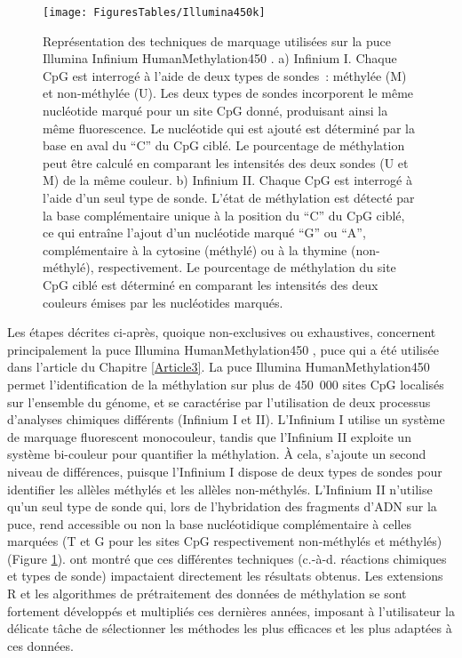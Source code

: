 \documentclass[11pt,a4paper,notrimn]{krantz}
\theoremstyle{definition}
\theoremstyle{definition}
\theoremstyle{remark}
\begin{document}
\begin{figure}[!htb]

{\centering \texttt{[image: FiguresTables/Illumina450k]} 

}

\caption{Représentation des techniques de marquage utilisées
sur la puce Illumina Infinium HumanMethylation450
\citep{maksimovic_swan:_2012}. a) Infinium I. Chaque CpG est interrogé à
l'aide de deux types de sondes~: méthylée (M) et non-méthylée (U). Les
deux types de sondes incorporent le même nucléotide marqué pour un site
CpG donné, produisant ainsi la même fluorescence. Le nucléotide qui est
ajouté est déterminé par la base en aval du ``C'' du CpG ciblé. Le
pourcentage de méthylation peut être calculé en comparant les intensités
des deux sondes (U et M) de la même couleur. b) Infinium II. Chaque CpG
est interrogé à l'aide d'un seul type de sonde. L'état de méthylation
est détecté par la base complémentaire unique à la position du ``C'' du
CpG ciblé, ce qui entraîne l'ajout d'un nucléotide marqué ``G'' ou
``A'', complémentaire à la cytosine (méthylé) ou à la thymine
(non-méthylé), respectivement. Le pourcentage de méthylation du site CpG
ciblé est déterminé en comparant les intensités des deux couleurs émises
par les nucléotides marqués.}\label{fig:Illumina450k}
\end{figure}

Les étapes décrites ci-après, quoique non-exclusives ou exhaustives,
concernent principalement la puce Illumina HumanMethylation450
\citep{bibikova_high_2011}, puce qui a été utilisée dans l'article du
Chapitre \ref{Article3}. La puce Illumina HumanMethylation450 permet
l'identification de la méthylation sur plus de 450~000 sites CpG
localisés sur l'ensemble du génome, et se caractérise par l'utilisation
de deux processus d'analyses chimiques différents (Infinium I et II).
L'Infinium I utilise un système de marquage fluorescent monocouleur,
tandis que l'Infinium II exploite un système bi-couleur pour quantifier
la méthylation. À cela, s'ajoute un second niveau de différences,
puisque l'Infinium I dispose de deux types de sondes pour identifier les
allèles méthylés et les allèles non-méthylés. L'Infinium II n'utilise
qu'un seul type de sonde qui, lors de l'hybridation des fragments d'ADN
sur la puce, rend accessible ou non la base nucléotidique complémentaire
à celles marquées (T et G pour les sites CpG respectivement non-méthylés
et méthylés) (Figure \ref{fig:Illumina450k}).
\citet{dedeurwaerder_evaluation_2011} ont montré que ces différentes
techniques (c.-à-d. réactions chimiques et types de sonde) impactaient
directement les résultats obtenus. Les extensions R et les algorithmes
de prétraitement des données de méthylation se sont fortement développés
et multipliés ces dernières années, imposant à l'utilisateur la délicate
tâche de sélectionner les méthodes les plus efficaces et les plus
adaptées à ces données.
\end{document}
